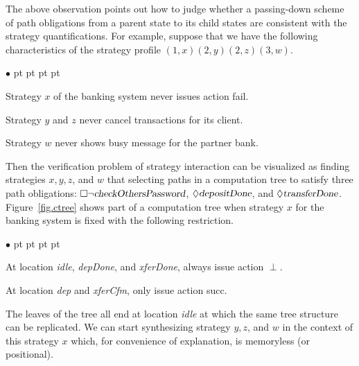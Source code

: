 \documentclass[11pt]{article}
\newcommand{\pfrr}{\Box}
\newcommand{\pevt}{\Diamond}
\newenvironment{list1}{\begin{list}{$\bullet$}
{\topsep 0 pt \parsep 0 pt \partopsep 0 pt \itemsep 0 pt}}{\end{list}}
\begin{document}
The above observation points out how to judge whether a passing-down scheme of path obligations 
from a parent state to its child states are consistent with the strategy quantifications.  
For example, suppose that we have the following characteristics of the strategy profile 
$(1,x)(2,y)(2,z)(3,w)$.
\begin{list1} 
\item Strategy $x$ of the banking system never issues action fail. 
\item Strategy $y$ and $z$ never cancel transactions for its client. 
\item Strategy $w$ never shows busy message for the partner bank. 
\end{list1} 
Then the verification problem of strategy interaction can be visualized as
finding strategies $x,y,z$, and $w$ that selecting paths in a computation tree 
to satisfy three path obligations: 
$\pfrr \neg \mbox{\sl checkOthersPassword}$, 
$\pevt \mbox{\sl depositDone}$, and $\pevt\mbox{\sl transferDone}$.  
Figure~\ref{fig.ctree} shows part of a computation tree when 
strategy $x$ for the banking system is fixed with the following restriction. 
\begin{figure*}[t] 
\begin{center} 
\caption{Part of the computation tree of the banking system} 
\label{fig.ctree}
\end{center} 
\end{figure*} 
\begin{list1} 
\item At location {\em idle}, {\em depDone}, and {\em xferDone}, always issue action $\perp$.  
\item At location {\em dep} and {\em xferCfm}, only issue action {\sf succ}.  
\end{list1} 
The leaves of the tree all end at location {\em idle} at which 
the same tree structure can be replicated.  
We can start synthesizing strategy $y,z$, and $w$ in the context 
of this strategy $x$ which, for convenience of explanation, is memoryless 
(or positional). 
\end{document}
